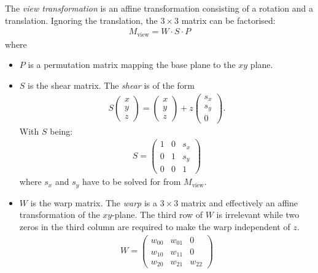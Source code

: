 The \emph{view transformation} is an affine transformation consisting of a rotation and a translation. Ignoring the translation, the $3\times 3$ matrix can be factorised:
\begin{align*}
    M_\text{view} = W\cdot S \cdot P
\end{align*}
where
\begin{itemize}
    \item $P$ is a permutation matrix mapping the base plane to the $xy$ plane.
    \item $S$ is the shear matrix. The \emph{shear} is of the form
        \begin{align*}
            S
            \begin{pmatrix}
                x\\
                y\\
                z
            \end{pmatrix} =
            \begin{pmatrix}
                x\\
                y\\
                z
            \end{pmatrix} + z
            \begin{pmatrix}
                s_x\\
                s_y\\
                0
            \end{pmatrix}.
        \end{align*}
        With $S$ being:
        \begin{align*}
            S =
            \begin{pmatrix}
                1 & 0 & s_x\\
                0 & 1 & s_y\\
                0& 0& 1
            \end{pmatrix}
        \end{align*}
        where $s_x$ and $s_y$ have to be solved for from $M_\text{view}$.
    \item $W$ is the warp matrix. The \emph{warp} is a $3\times 3$ matrix and effectively an affine transformation of the $xy$-plane. The third row of $W$ is irrelevant while two zeros in the third column are required to make the warp independent of $z$.
    \begin{align*}
        W = 
            \begin{pmatrix}
                w_{00} & w_{01} & 0\\
                w_{10} & w_{11} & 0\\
                w_{20} & w_{21} & w_{22}
            \end{pmatrix}
    \end{align*}
\end{itemize}

